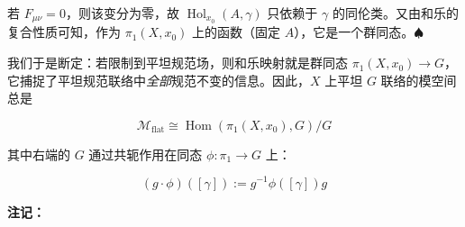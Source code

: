 若 $F_{\mu\nu}=0$，则该变分为零，故 $\operatorname{Hol}_{x_0}(A,\gamma)$ 只依赖于 $\gamma$ 的同伦类。又由和乐的复合性质可知，作为 $\pi_1(X,x_0)$ 上的函数（固定 $A$），它是一个群同态。$\spadesuit$


我们于是断定：若限制到平坦规范场，则和乐映射就是群同态 $\pi_1(X,x_0)\to G$，它捕捉了平坦规范联络中\emph{全部}规范不变的信息。因此，$X$ 上平坦 $G$ 联络的模空间总是

\begin{equation}
  \mathcal{M}_{\mathrm{flat}}\cong\operatorname{Hom}(\pi_1(X,x_0),G)/G
  \tag{2.107}
  \label{eq:2.107}
\end{equation}

其中右端的 $G$ 通过共轭作用在同态 $\phi:\pi_1\to G$ 上：

\begin{equation}
  (g\cdot\phi)([\gamma]):=g^{-1}\phi([\gamma])g
  \tag{2.108}
  \label{eq:2.108}
\end{equation}

\textbf{注记：}


